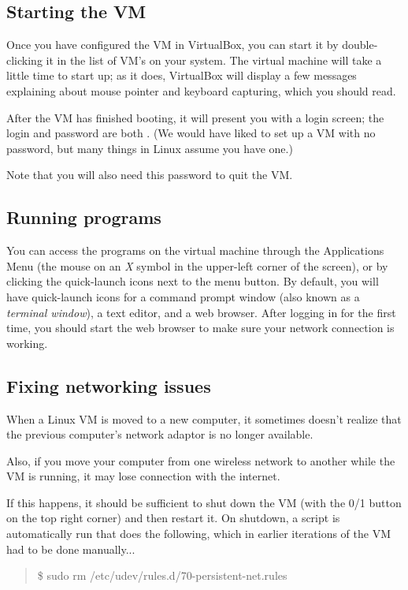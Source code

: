 \documentclass[letterpaper,10pt,english]{sphinxmanual}
\begin{document}
\subsection{Starting the VM}
\label{vm:starting-the-vm}
Once you have configured the VM in VirtualBox, you can start it by
double-clicking it in the list of VM's on your system.  The virtual
machine will take a little time to start up; as it does, VirtualBox
will display a few messages explaining about mouse pointer and
keyboard capturing, which you should read.

After the VM has finished booting, it will present you with a login
screen; the login and password are both .  (We would have
liked to set up a VM with no password, but many things in Linux assume
you have one.)

Note that you will also need this password to quit the VM.


\subsection{Running programs}
\label{vm:running-programs}
You can access the programs on the virtual machine through the Applications
Menu (the mouse on an \emph{X} symbol in the upper-left corner of the
screen), or by clicking the quick-launch icons next to the menu
button.  By default, you will have quick-launch icons for a command
prompt window (also known as a \emph{terminal window}), a text editor, and
a web browser.  After logging in for the first time, you should start
the web browser to make sure your network connection is working.


\subsection{Fixing networking issues}
\label{vm:fixing-networking-issues}
When a Linux VM is moved to a new computer, it sometimes doesn't
realize that the previous computer's network adaptor is no longer
available.

Also, if you move your computer from one wireless network to another while
the VM is running, it may lose connection with the internet.

If this happens, it should be sufficient to shut down the VM (with the 0/1
button on the top right corner) and then restart it.
On shutdown, a script is automatically run that does the following, which in
earlier iterations of the VM had to be done manually...
\begin{quote}

\$ sudo rm /etc/udev/rules.d/70-persistent-net.rules
\end{quote}
\end{document}
